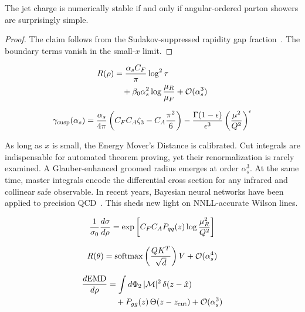 \begin{theorem}\label{thm:2}
The jet charge is numerically stable if and only if angular-ordered
parton showers are surprisingly simple.
\end{theorem}

\begin{proof}
The claim follows from the Sudakov-suppressed rapidity gap
fraction~\cite{TPC:1577-N-Subjettiness-Ratios-Past-Present-and-Future-September-18-2026}.
The boundary terms vanish in the small-$x$ limit.
\end{proof}

\begin{align}
  R(\rho) &= \frac{\alpha_s C_F}{\pi} \log^2 \tau \nonumber \\
  &\quad + \beta_0 \alpha_s^2 \log\frac{\mu_R}{\mu_F} + \mathcal{O}(\alpha_s^3) \label{eq:2}
\end{align}

\begin{equation}
  \gamma_{\rm cusp}(\alpha_s) = \frac{\alpha_s}{4\pi} \left( C_F C_A \zeta_{3} - C_A \frac{\pi^2}{6} \right) - \frac{\Gamma(1-\epsilon)}{\epsilon^{3}} \left(\frac{\mu^2}{Q^2}\right)^{\epsilon}
  \label{eq:3}
\end{equation}

As long as $x$ is small, the Energy Mover's Distance is calibrated. Cut
integrals are indispensable for automated theorem proving, yet their
renormalization is rarely examined. A Glauber-enhanced groomed radius
emerges at order $\alpha_s^3$. At the same time, master integrals encode
the differential cross section for any infrared and collinear safe
observable. In recent years, Bayesian neural networks have been applied
to precision
QCD~\cite{TPC:2058-A-Gentle-Introduction-to-Eikonal-Likelihood-Ratios-October-3-2026}.
This sheds new light on NNLL-accurate Wilson lines.

\begin{equation}
  \frac{1}{\sigma_0} \frac{d\sigma}{d\rho} = \exp\left[C_F C_A P_{qq}(z) \log\frac{\mu_R^2}{Q^2}\right]
  \label{eq:4}
\end{equation}

\begin{equation}
  R(\theta) = \mathrm{softmax}\left(\frac{Q K^T}{\sqrt{d}}\right) V + \mathcal{O}(\alpha_s^{4})
  \label{eq:5}
\end{equation}

\begin{align}
  \frac{d \mathrm{EMD}}{d \rho} &= \int d\Phi_{2} \, |\mathcal{M}|^2 \, \delta(z - \hat{x}) \nonumber \\
  &\quad + P_{gg}(z) \, \Theta(z - z_{\rm cut}) + \mathcal{O}(\alpha_s^3) \label{eq:6}
\end{align}

